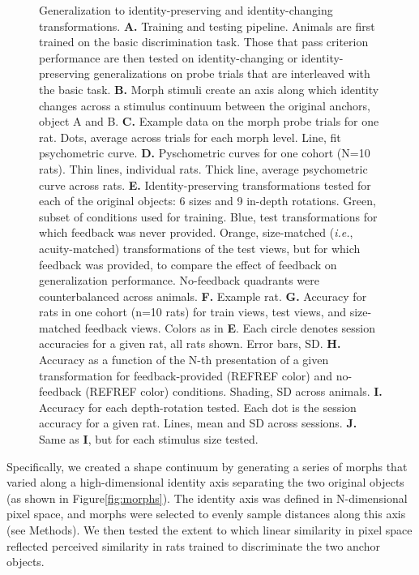 \begin{figure}[t!]
    \caption[Generalization of visual behavior]{Generalization to identity-preserving and identity-changing transformations. \textbf{A.} Training and testing pipeline. Animals are first trained on the basic discrimination task. Those that pass criterion performance are then tested on identity-changing or identity-preserving generalizations on probe trials that are interleaved with the basic task. \textbf{B.} Morph stimuli create an axis along which identity changes across a stimulus continuum between the original anchors, object A and B. \textbf{C.} Example data on the morph probe trials for one rat. Dots, average across trials for each morph level. Line, fit psychometric curve. \textbf{D.} Pyschometric curves for one cohort (N=10 rats). Thin lines, individual rats. Thick line, average psychometric curve across rats. \textbf{E.} Identity-preserving transformations tested for each of the original objects: 6 sizes and 9 in-depth rotations. Green, subset of conditions used for training. Blue, test transformations for which feedback was never provided. Orange, size-matched (\textit{i.e.}, acuity-matched) transformations of the test views, but for which feedback was provided, to compare the effect of feedback on generalization performance. No-feedback quadrants were counterbalanced across animals. \textbf{F.} Example rat. \textbf{G.} Accuracy for rats in one cohort (n=10 rats) for train views, test views, and size-matched feedback views. Colors as in \textbf{E}. Each circle denotes session accuracies for a given rat, all rats shown. Error bars, SD. \textbf{H.} Accuracy as a function of the N-th presentation of a given transformation for feedback-provided (REFREF color) and no-feedback (REFREF color) conditions. Shading, SD across animals. \textbf{I.} Accuracy for each depth-rotation tested. Each dot is the session accuracy for a given rat. Lines, mean and SD across sessions. \textbf{J.} Same as \textbf{I}, but for each stimulus size tested. 
    \label{fig:behavior_generalization}}
\end{figure}

Specifically, we created a shape continuum by generating a series of morphs that varied along a high-dimensional identity axis separating the two original objects (as shown in Figure\ref{fig:morphs}). The identity axis was defined in N-dimensional pixel space, and morphs were selected to evenly sample distances along this axis (see Methods). We then tested the extent to which linear similarity in pixel space reflected perceived similarity in rats trained to discriminate the two anchor objects. 

